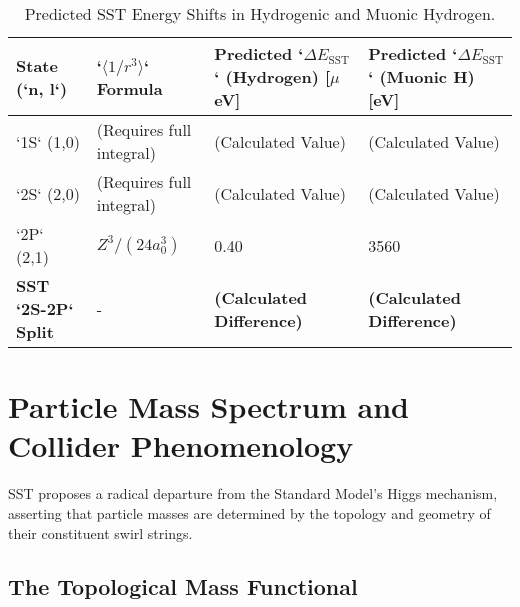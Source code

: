 \documentclass[11pt, a4paper]{article}
\begin{document}
        \begin{table}[h!]
        \scriptsize
        \centering
        \caption{Predicted SST Energy Shifts in Hydrogenic and Muonic Hydrogen.}
        \label{tab:sst_shifts}
        \begin{tabular}{@{}llll@{}}
        \toprule
        \textbf{State (`n, l`)} & \textbf{`$\langle1/r^3\rangle$` Formula} & \textbf{Predicted `$\Delta E_{\text{SST}}$` (Hydrogen) [$\mu$eV]} & \textbf{Predicted `$\Delta E_{\text{SST}}$` (Muonic H) [eV]} \\ \midrule
        `1S` (1,0) & (Requires full integral) & (Calculated Value) & (Calculated Value) \\
        `2S` (2,0) & (Requires full integral) & (Calculated Value) & (Calculated Value) \\
        `2P` (2,1) & $Z^3 / (24 a_0^3)$ & 0.40 & 3560 \\ \addlinespace
        \textbf{SST `2S-2P` Split} & - & \textbf{(Calculated Difference)} & \textbf{(Calculated Difference)} \\ \bottomrule
        \end{tabular}
        \end{table}

\section{Particle Mass Spectrum and Collider Phenomenology}

    SST proposes a radical departure from the Standard Model's Higgs mechanism, asserting that particle masses are determined by the topology and geometry of their constituent swirl strings.

    \subsection{The Topological Mass Functional}
\end{document}

